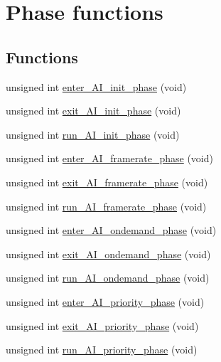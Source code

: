 \hypertarget{group__phase__functions}{}\section{Phase functions}
\label{group__phase__functions}
\subsection*{Functions}
\begin{DoxyCompactItemize}
\item 
unsigned int \hyperlink{group__phase__functions_ga0e1368f0c31e5eca7cf2eacb84a1a426}{enter\+\_\+\+A\+I\+\_\+init\+\_\+phase} (void)
\item 
unsigned int \hyperlink{group__phase__functions_ga98bab61b394f3485b919280ea9af876f}{exit\+\_\+\+A\+I\+\_\+init\+\_\+phase} (void)
\item 
unsigned int \hyperlink{group__phase__functions_ga6bb4b660e654f63d0ac7516e14552c47}{run\+\_\+\+A\+I\+\_\+init\+\_\+phase} (void)
\item 
unsigned int \hyperlink{group__phase__functions_ga90ff9fa182b94d1aae86d5fa66b3aeb0}{enter\+\_\+\+A\+I\+\_\+framerate\+\_\+phase} (void)
\item 
unsigned int \hyperlink{group__phase__functions_ga32e701467822bc27478c216b7da06ec8}{exit\+\_\+\+A\+I\+\_\+framerate\+\_\+phase} (void)
\item 
unsigned int \hyperlink{group__phase__functions_gac06aedc91bebb4d075fcf947c4b3eea3}{run\+\_\+\+A\+I\+\_\+framerate\+\_\+phase} (void)
\item 
unsigned int \hyperlink{group__phase__functions_ga349d9768b4799a88391227b9e96dd96b}{enter\+\_\+\+A\+I\+\_\+ondemand\+\_\+phase} (void)
\item 
unsigned int \hyperlink{group__phase__functions_ga0b4e9b0dc851d034c95ed64e4677fa60}{exit\+\_\+\+A\+I\+\_\+ondemand\+\_\+phase} (void)
\item 
unsigned int \hyperlink{group__phase__functions_gab7ce668503b6b6b8b508a764d2a0e7d8}{run\+\_\+\+A\+I\+\_\+ondemand\+\_\+phase} (void)
\item 
unsigned int \hyperlink{group__phase__functions_ga29bc2053775769341c5ce4cb36bc88d2}{enter\+\_\+\+A\+I\+\_\+priority\+\_\+phase} (void)
\item 
unsigned int \hyperlink{group__phase__functions_gad0d0b1ac3bd2b368ecb4d534c85a0a71}{exit\+\_\+\+A\+I\+\_\+priority\+\_\+phase} (void)
\item 
unsigned int \hyperlink{group__phase__functions_ga880561ebeeff8e1b88ba85b14f01d48b}{run\+\_\+\+A\+I\+\_\+priority\+\_\+phase} (void)

\end{DoxyCompactItemize}
